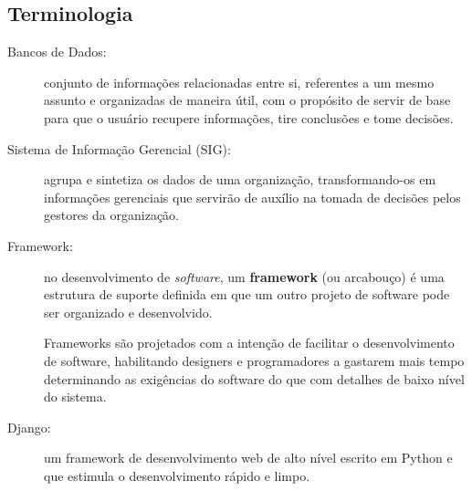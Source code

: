 \subsection{Terminologia}
\begin{description}
\item[Bancos de Dados:] conjunto de informações relacionadas entre
  si, referentes a um mesmo assunto e organizadas de maneira útil, com
  o propósito de servir de base para que o usuário recupere
  informações, tire conclusões e tome decisões.
\item[Sistema de Informação Gerencial (SIG):] agrupa e sintetiza os
  dados de uma organização, transformando-os em informações gerenciais
  que servirão de auxílio na tomada de decisões pelos gestores da
  organização.
\item[Framework:] no desenvolvimento de \textit{software}, um
  \textbf{framework} (ou arcabouço) é uma estrutura de suporte
  definida em que um outro projeto de software pode ser organizado e
  desenvolvido.

  Frameworks são projetados com a intenção de facilitar o
  desenvolvimento de software, habilitando designers e programadores a
  gastarem mais tempo determinando as exigências do software do que
  com detalhes de baixo nível do sistema.
\item[Django:] um framework de desenvolvimento web de alto nível
  escrito em Python e que estimula o desenvolvimento rápido e limpo.
\end{description}

%
%
